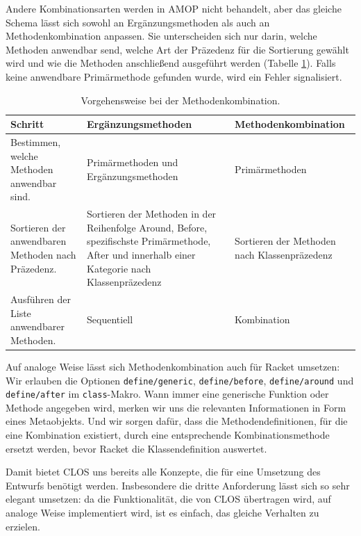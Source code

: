 Andere Kombinationsarten werden in AMOP nicht behandelt, aber das gleiche Schema lässt sich sowohl an Ergänzungsmethoden als auch an Methodenkombination anpassen. Sie unterscheiden sich nur darin, welche Methoden anwendbar send, welche Art der Präzedenz für die Sortierung gewählt wird und wie die Methoden anschließend ausgeführt werden (Tabelle \ref{combination}). Falls keine anwendbare Primärmethode gefunden wurde, wird ein Fehler signalisiert.

\begin{table}[h]
\begin{tabular}{|p{4.7cm}|p{4.5cm}|p{4.5cm}|}
 \hline
 \textbf{Schritt} & \textbf{Ergänzungsmethoden} & \textbf{Methodenkombination}\\\hline
 Bestimmen, welche Methoden anwendbar sind. & Primärmethoden und Ergänzungsmethoden & Primärmethoden \\\hline
 Sortieren der anwendbaren Methoden nach Präzedenz. & Sortieren der Methoden in der Reihenfolge Around, Before, spezifischste Primärmethode, After und innerhalb einer Kategorie nach Klassenpräzedenz & Sortieren der Methoden nach Klassenpräzedenz\\\hline
 Ausführen der Liste anwendbarer Methoden. & Sequentiell & Kombination\\\hline
\end{tabular}
 \caption{Vorgehensweise bei der Methodenkombination.}
 \label{combination}
\end{table}

Auf analoge Weise lässt sich Methodenkombination auch für Racket umsetzen: 
Wir erlauben die Optionen \texttt{define/generic}, \texttt{define/before}, \texttt{define/around} und \texttt{define/after} im \texttt{class}-Makro. Wann immer eine generische Funktion oder Methode angegeben wird, merken wir uns die relevanten Informationen in Form eines Metaobjekts. Und wir sorgen dafür, dass die Methodendefinitionen, für die eine Kombination existiert, durch eine entsprechende Kombinationsmethode ersetzt werden, bevor Racket die Klassendefinition auswertet.

Damit bietet CLOS uns bereits alle Konzepte, die für eine Umsetzung des Entwurfs benötigt werden. Insbesondere die dritte Anforderung lässt sich so sehr elegant umsetzen: da die Funktionalität, die von CLOS übertragen wird, auf analoge Weise implementiert wird, ist es einfach, das gleiche Verhalten zu erzielen.